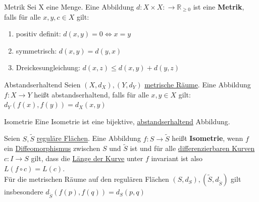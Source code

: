 \begin{titleDef}{Metrik}
\label{Metrik}
Sei X eine Menge. Eine Abbildung $d:X\times X:\to \mathbb{R}_{\ge0}$ ist eine \textbf{Metrik}, falls für alle $x,y,c\in X$ gilt:
\begin{enumerate}
    \item positiv definit: $d(x,y)=0\Leftrightarrow x=y$
    \item symmetrisch: $d(x,y)=d(y,x)$
    \item Dreickesungleichung: $d(x,z)\le d(x,y)+d(y,z)$
\end{enumerate}
\end{titleDef}

\begin{titleDef}{Abstandserhaltend}
\label{abstandserhaltend}
Seien $(X,d_X),(Y,d_Y)$ \hyperref[MetrischerRaum]{metrische Räume}. Eine Abbildung $f:X\to Y$ heißt abstandserhaltend, falls für alle $x,y\in X$ gilt: $d_Y(f(x),f(y))=d_X(x,y)$
\end{titleDef}

\begin{titleDef}{Isometrie}
\label{Isometrie}
Eine Isometrie ist eine bijektive, \hyperref[abstandserhaltende]{abstandserhaltend} Abbildung.\par
Seien $S,\tilde{S}$ \hyperref[regFlaeche]{reguläre Flächen}. Eine Abbildung $f:S\to\tilde{S}$ heißt \textbf{Isometrie}, wenn $f$ ein \hyperref[diffeomorph]{Diffeomorphismus} zwischen $S$ und $\tilde{S}$ ist und für alle \hyperref[diffFlaechenkurve]{differenzierbaren Kurven} $c:I\to S$ gilt, dass die \hyperref[laengeFlaechenkurve]{Länge der Kurve} unter $f$ invariant ist also $L(f\circ c)=L(c)$.\\
Für die metrischen Räume auf den regulären Flächen $(S,d_S),(\tilde{S},d_{\tilde{S}})$ gilt insbesondere $d_{\tilde{S}}(f(p),f(q))=d_S(p,q)$
\end{titleDef}

